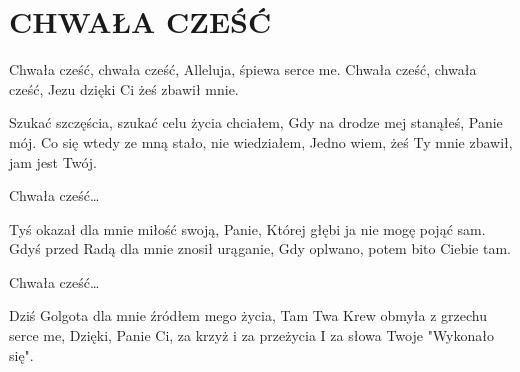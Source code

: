 \documentclass[../../../songbook.tex]{subfiles}
\begin{document}
\TabPositions{8cm} %
\section*{CHWAŁA CZEŚĆ}
{}
\vspace{0.5cm}
\-\hspace{1cm} Chwała cześć, chwała cześć, 		 \newline
\-\hspace{1cm} Alleluja, śpiewa serce me. 		 \newline
\-\hspace{1cm} Chwała cześć, chwała cześć, 		 \newline
\-\hspace{1cm} Jezu dzięki Ci żeś zbawił mnie. 		 \newline

Szukać szczęścia, szukać celu życia chciałem, 		 \newline
Gdy na drodze mej stanąłeś, Panie mój. 		 \newline
Co się wtedy ze mną stało, nie wiedziałem, 		 \newline
Jedno wiem, żeś Ty mnie zbawił, jam jest Twój. 		 \newline

\-\hspace{1cm} Chwała cześć…			\newline

Tyś okazał dla mnie miłość swoją, Panie, 			\newline
Której głębi ja nie mogę pojąć sam. 			\newline
Gdyś przed Radą dla mnie znosił urąganie, 			\newline
Gdy oplwano, potem bito Ciebie tam. 			\newline

\-\hspace{1cm} Chwała cześć…			\newline

Dziś Golgota dla mnie źródłem mego życia, 			\newline
Tam Twa Krew obmyła z grzechu serce me, 			\newline
Dzięki, Panie Ci, za krzyż i za przeżycia 			\newline
I za słowa Twoje "Wykonało się". 			\newline
\end{document}
